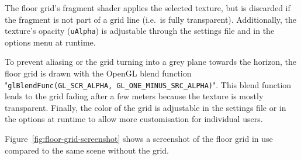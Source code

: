 The floor grid's fragment shader applies the selected texture, but is discarded if the fragment is not part of a grid
line (i.e.\ is fully transparent).
Additionally, the texture's opacity (\texttt{uAlpha}) is adjustable through the settings file and
in the options menu at runtime.

To prevent aliasing or the grid turning into a grey plane towards the horizon, the floor grid is drawn with the
OpenGL blend function "\texttt{glBlendFunc(GL_SCR_ALPHA, GL_ONE_MINUS_SRC_ALPHA)}".
This blend function leads to the grid fading after a few meters because the texture is mostly transparent.
Finally, the color of the grid is adjustable in the settings file or in the options at runtime to allow more
customisation for individual users.

Figure~\ref{fig:floor-grid-screenshot} shows a screenshot of the floor grid in use compared to the same scene without
the grid.
